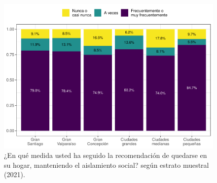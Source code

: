\documentclass[
  12pt,
]{book}
\begin{document}
\begin{figure}

{\centering \includegraphics{reporte-elsoc_files/figure-latex/dist-estrato-1} 

}

\caption{¿En qué medida usted ha seguido la recomendación de quedarse en su hogar, manteniendo el aislamiento social? según estrato muestral (2021).}\label{fig:dist-estrato}
\end{figure}
\end{document}

